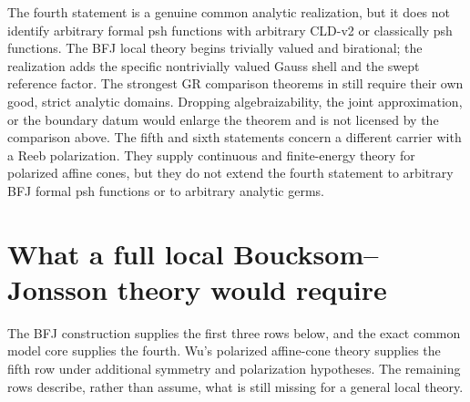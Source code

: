 The fourth statement is a genuine common analytic realization, but it does
not identify arbitrary formal psh functions with arbitrary CLD-v2 or
classically psh functions. The BFJ local theory begins trivially valued and
birational; the realization adds the specific nontrivially valued Gauss
shell and the swept reference factor. The strongest GR comparison theorems
in  still require their own good, strict
analytic domains. Dropping algebraizability, the joint approximation, or
the boundary datum would enlarge the theorem and is not licensed by the
comparison above.  The fifth and sixth statements concern a different
carrier with a Reeb polarization.  They supply continuous and finite-energy
theory for polarized affine cones, but they do not extend the fourth
statement to arbitrary BFJ formal psh functions or to arbitrary analytic
germs.

\section{What a full local Boucksom--Jonsson theory would require}
\label{sec:local-general-theory-requirements}

The BFJ construction supplies the first three rows below, and the exact
common model core supplies the fourth.  Wu's polarized affine-cone theory
supplies the fifth row under additional symmetry and polarization
hypotheses.  The remaining rows describe, rather than assume, what is still
missing for a general local theory.

